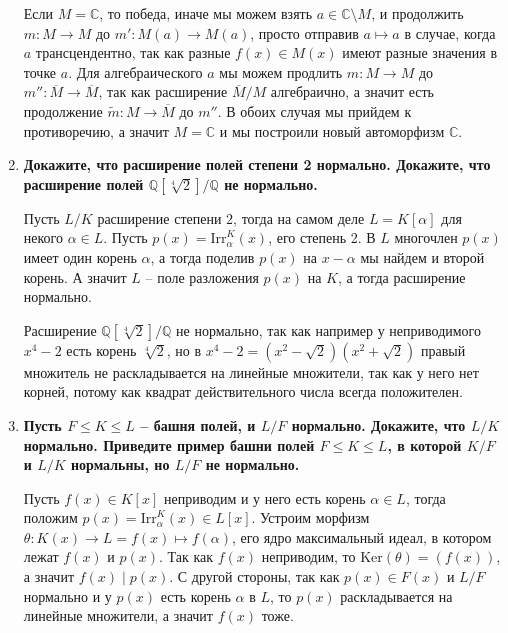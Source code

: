\documentclass{article}
\begin{document}
\begin{enumerate}
        Если $M=\mathbb{C}$, то победа, иначе мы можем взять $a\in\mathbb{C}
        \setminus M$, и продолжить $m:M\rightarrow M$ до $m':M(a)\rightarrow
        M(a)$, просто отправив $a\mapsto a$ в случае, когда $a$ трансцендентно,
        так как разные $f(x)\in M(x)$ имеют разные значения в точке $a$. Для
        алгебраического $a$ мы можем продлить $m:M\rightarrow M$ до $m'':\overline
        M\rightarrow\overline M$, так как расширение $\overline M/M$ алгебраично,
        а значит есть продолжение $\widetilde m:M\rightarrow\overline M$ до
        $m''$. В обоих случая мы прийдем к противоречию, а значит $M=\mathbb{C}$
        и мы построили новый автоморфизм $\mathbb{C}$.

    \item \textbf{Докажите, что расширение полей степени 2 нормально. Докажите,
        что расширение полей $\mathbb{Q}[\sqrt[4]{2}]/\mathbb{Q}$ не нормально.}

        Пусть $L/K$ расширение степени $2$, тогда на самом деле $L=K[\alpha]$
        для некого $\alpha\in L$. Пусть $p(x)=\text{Irr}_\alpha^K(x)$, его
        степень 2. В $L$ многочлен $p(x)$ имеет один корень $\alpha$, а тогда
        поделив $p(x)$ на $x-\alpha$ мы найдем и второй корень. А значит $L$ –
        поле разложения $p(x)$ на $K$, а тогда расширение нормально.

        Расширение $\mathbb{Q}[\sqrt[4]{2}]/\mathbb{Q}$ не нормально, так
        как например у неприводимого $x^4-2$ есть корень $\sqrt[4]{2}$, но в
        $x^4-2=(x^2-\sqrt{2})(x^2+\sqrt{2})$ правый множитель не раскладывается
        на линейные множители, так как у него нет корней, потому как квадрат
        действительного числа всегда положителен.

    \item \textbf{Пусть $F\le K\le L$ – башня полей, и $L/F$ нормально.
        Докажите, что $L/K$ нормально. Приведите пример башни полей $F\le K\le L$,
        в которой $K/F$ и $L/K$ нормальны, но $L/F$ не нормально.}

        Пусть $f(x)\in K[x]$ неприводим и у него есть корень $\alpha\in L$,
        тогда положим $p(x)=\text{Irr}_\alpha^K(x)\in L[x]$. Устроим морфизм
        $\theta:K(x)\rightarrow L=f(x)\mapsto f(\alpha)$, его ядро
        максимальный идеал, в котором лежат $f(x)$ и $p(x)$. Так как $f(x)$
        неприводим, то $\text{Ker}(\theta)=(f(x))$, а значит $f(x)\mid p(x)$.
        С другой стороны, так как $p(x)\in F(x)$ и $L/F$ нормально и у $p(x)$
        есть корень $\alpha$ в $L$, то $p(x)$ раскладывается на линейные
        множители, а значит $f(x)$ тоже.


\end{enumerate}
\end{document}
